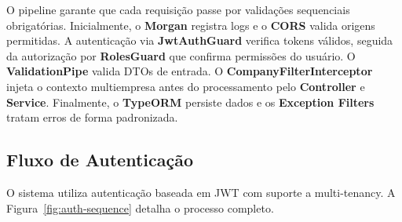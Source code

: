 O pipeline garante que cada requisição passe por validações sequenciais obrigatórias. Inicialmente, o \textbf{Morgan} registra logs e o \textbf{CORS} valida origens permitidas. A autenticação via \textbf{JwtAuthGuard} verifica tokens válidos, seguida da autorização por \textbf{RolesGuard} que confirma permissões do usuário. O \textbf{ValidationPipe} valida DTOs de entrada. O \textbf{CompanyFilterInterceptor} injeta o contexto multiempresa antes do processamento pelo \textbf{Controller} e \textbf{Service}. Finalmente, o \textbf{TypeORM} persiste dados e os \textbf{Exception Filters} tratam erros de forma padronizada.

\subsection{Fluxo de Autenticação}

O sistema utiliza autenticação baseada em JWT com suporte a multi-tenancy. A Figura~\ref{fig:auth-sequence} detalha o processo completo.

